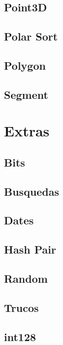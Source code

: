 \subsection{Point3D}
\raggedbottom
\hrulefill
\subsection{Polar Sort}
\raggedbottom
\hrulefill
\subsection{Polygon}
\raggedbottom
\hrulefill
\subsection{Segment}
\raggedbottom
\hrulefill
\newpage

\section{Extras}
\subsection{Bits}
\raggedbottom
\hrulefill
\subsection{Busquedas}
\raggedbottom
\hrulefill
\subsection{Dates}
\raggedbottom
\hrulefill
\subsection{Hash Pair}
\raggedbottom
\hrulefill
\subsection{Random}
\raggedbottom
\hrulefill
\subsection{Trucos}
\raggedbottom
\hrulefill
\subsection{int128}
\raggedbottom
\hrulefill
\newpage


